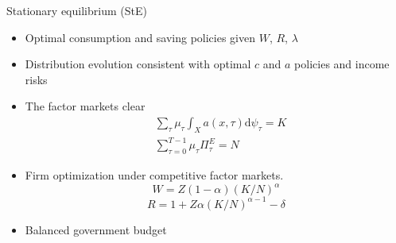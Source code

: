 \documentclass{beamer}
\begin{document}
\begin{frame}{Stationary equilibrium (StE)}
\begin{itemize}
	\item Optimal consumption and saving policies given $W$, $R$, $\lambda$
	\item Distribution evolution consistent with optimal $c$ and $a$ policies and income risks
	\item The factor markets clear 
	\begin{equation*}
	\begin{split}
		& \sum_{\tau} \mu_{\tau} \int_{X}a(x, \tau) \mathrm{d} \psi_{\tau}=K \\
		& \sum^{T-1}_{\tau=0} \mu_{\tau} \Pi^E_\tau= N
	\end{split}
	\end{equation*}
\item Firm optimization under competitive factor markets.
$$W = Z(1-\alpha) (K/N)^\alpha $$
$$R = 1+Z\alpha (K/N)^{\alpha-1} - \delta$$
\item Balanced government budget 
\end{itemize}
\end{frame}
\end{document}
